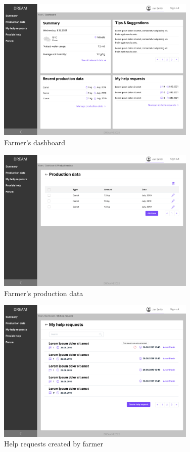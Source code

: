 \begin{figure}[H]
\centering
\includegraphics[width=0.85\textwidth]{mockups/Farmer_Dashboard.png}
\caption{Farmer's dashboard}
\end{figure}

\begin{figure}[H]
\centering
\includegraphics[width=0.85\textwidth]{mockups/Farmer_Dashboard_Production data.png}
\caption{Farmer's production data}
\end{figure}

\begin{figure}[H]
\centering
\includegraphics[width=0.85\textwidth]{mockups/Farmer_Dashboard_My help requests.png}
\caption{Help requests created by farmer}
\end{figure}

